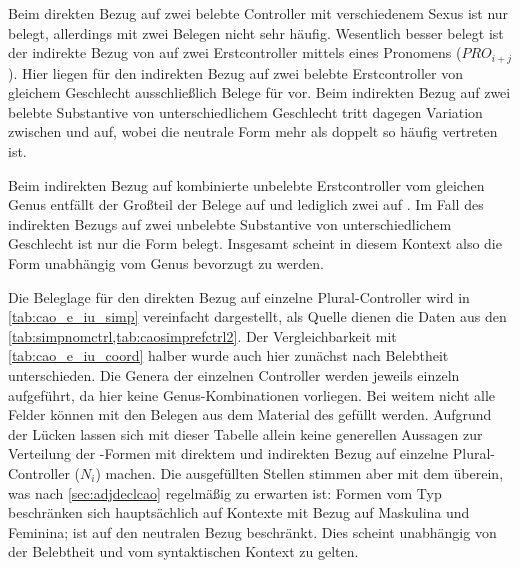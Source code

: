 Beim direkten Bezug auf zwei belebte Controller mit verschiedenem Sexus ist nur
 belegt, allerdings mit zwei Belegen nicht sehr häufig. Wesentlich
besser belegt ist der indirekte Bezug von  auf zwei Erstcontroller
mittels eines Pronomens ($PRO_{i+j}$). Hier liegen für den indirekten Bezug auf
zwei belebte Erstcontroller von gleichem Geschlecht ausschließlich Belege für
 vor. Beim indirekten Bezug auf zwei belebte Substantive von
unterschiedlichem Geschlecht tritt dagegen Variation zwischen  und
 auf, wobei die neutrale Form  mehr als doppelt so
häufig vertreten ist.

Beim indirekten Bezug auf kombinierte unbelebte Erstcontroller vom gleichen
Genus entfällt der Großteil der Belege auf  und lediglich zwei auf
. Im Fall des indirekten Bezugs auf zwei unbelebte Substantive von
unterschiedlichem Geschlecht ist nur die Form  belegt. Insgesamt
scheint in diesem Kontext also die Form  unabhängig vom Genus
bevorzugt zu werden.

Die Beleglage für den direkten Bezug auf einzelne Plural-Controller wird in
\cref{tab:cao_e_iu_simp} vereinfacht dargestellt, als Quelle dienen die Daten
aus den \cref{tab:simpnomctrl,tab:caosimprefctrl2}. Der Vergleichbarkeit mit
\cref{tab:cao_e_iu_coord} halber wurde auch hier zunächst nach Belebtheit
unterschieden. Die Genera der einzelnen Controller werden jeweils einzeln
aufgeführt, da hier keine Genus-Kombinationen vorliegen. Bei weitem nicht alle
Felder können mit den Belegen aus dem Material des \CAO{} gefüllt
werden. Aufgrund der Lücken lassen sich mit dieser Tabelle allein keine
generellen Aussagen zur Verteilung der -Formen mit direktem und
indirekten Bezug auf einzelne Plural-Controller ($N_i$) machen. Die
ausgefüllten Stellen stimmen aber mit dem überein, was nach
\cref{sec:adjdeclcao} regelmäßig zu erwarten ist: Formen vom Typ 
beschränken sich hauptsächlich auf Kon\-texte mit Bezug auf Maskulina und
Feminina;  ist auf den neutralen Bezug beschränkt. Dies scheint
unabhängig von der Belebtheit und vom syntaktischen Kontext zu gelten.

